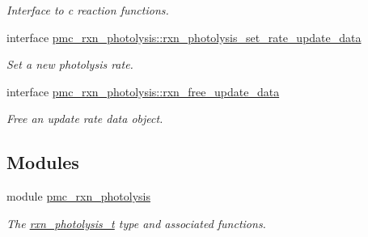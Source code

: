 \begin{DoxyCompactItemize}
\begin{DoxyCompactList}\small\item\em Interface to c reaction functions. \end{DoxyCompactList}\item 
interface \mbox{\hyperlink{interfacepmc__rxn__photolysis_1_1rxn__photolysis__set__rate__update__data}{pmc\+\_\+rxn\+\_\+photolysis\+::rxn\+\_\+photolysis\+\_\+set\+\_\+rate\+\_\+update\+\_\+data}}
\begin{DoxyCompactList}\small\item\em Set a new photolysis rate. \end{DoxyCompactList}\item 
interface \mbox{\hyperlink{interfacepmc__rxn__photolysis_1_1rxn__free__update__data}{pmc\+\_\+rxn\+\_\+photolysis\+::rxn\+\_\+free\+\_\+update\+\_\+data}}
\begin{DoxyCompactList}\small\item\em Free an update rate data object. \end{DoxyCompactList}\end{DoxyCompactItemize}
\subsection*{Modules}
\begin{DoxyCompactItemize}
\item 
module \mbox{\hyperlink{namespacepmc__rxn__photolysis}{pmc\+\_\+rxn\+\_\+photolysis}}
\begin{DoxyCompactList}\small\item\em The \mbox{\hyperlink{structpmc__rxn__photolysis_1_1rxn__photolysis__t}{rxn\+\_\+photolysis\+\_\+t}} type and associated functions. \end{DoxyCompactList}\end{DoxyCompactItemize}
